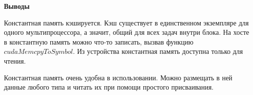 \textbf{\large Выводы}

Константная память кэшируется. Кэш существует в единственном экземпляре для одного мультипроцессора, а значит, общий для всех задач внутри блока. На хосте в константную память можно что-то записать, вызвав функцию $cudaMemcpyToSymbol$. Из устройства константная память доступна только для чтения.

Константная память очень удобна в использовании. Можно размещать в ней данные любого типа и читать их при помощи простого присваивания.